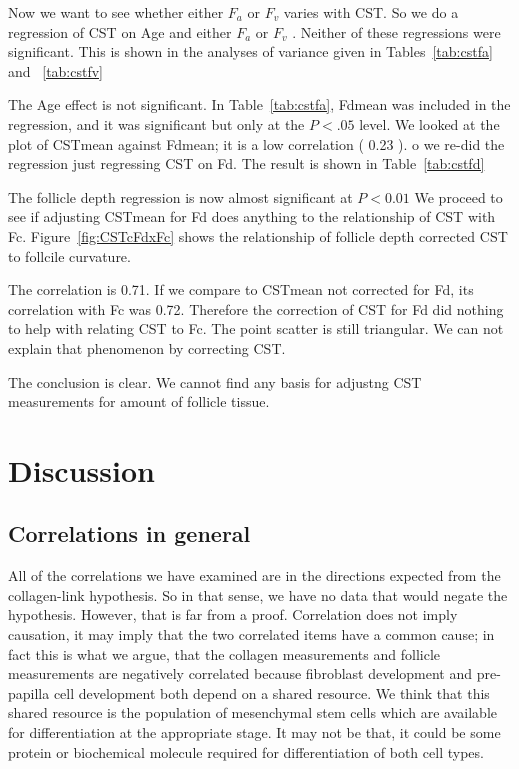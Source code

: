 \documentclass[titlepage]{article}  %
\begin{document}
Now we want to see whether either $F_{a}$ or $F_{v}$ varies with CST. So we do a regression of CST on Age and either $F_{a}$ or $F_{v}$ . Neither of these regressions were significant. This is shown in the analyses of variance given in Tables~\ref{tab:cstfa} and ~\ref{tab:cstfv}


The Age effect is not significant. In Table~\ref{tab:cstfa}, Fdmean was included in the regression, and it was significant but only at the $P<.05$ level. We looked at the plot of CSTmean against Fdmean; it is a low correlation ( 0.23 ). 
o we re-did the regression just regressing CST on Fd. The result is shown in Table~\ref{tab:cstfd}

The follicle depth regression is now almost significant at $P<0.01$
We proceed to see if adjusting CSTmean for Fd does anything to the relationship of CST with Fc. Figure~\ref{fig:CSTcFdxFc} shows the relationship of follicle depth corrected CST to follcile curvature.

The correlation is 0.71. If we compare to CSTmean not corrected for Fd, its correlation with Fc was 0.72. Therefore the correction of CST for Fd did nothing to help with relating CST to Fc. The point scatter is still triangular. We can not explain that phenomenon by correcting CST.


The conclusion is clear. We cannot find any basis for adjustng CST measurements for amount of follicle tissue.


\clearpage
\section{Discussion}
\subsection{Correlations in general}
 All of the correlations we have examined are in the directions expected from the collagen-link hypothesis.  So in that sense, we have no data that would negate the hypothesis. However, that is far from a proof. Correlation does not imply causation, it may imply that the two correlated items have a common cause; in fact this is what we argue, that the collagen measurements and follicle measurements are negatively correlated because fibroblast development and pre-papilla cell development both depend on a shared resource. We think that this shared resource is the population of mesenchymal stem cells which are available for differentiation at the appropriate stage. It may not be that, it could be some protein or biochemical molecule required for differentiation of both cell types.
\end{document}
